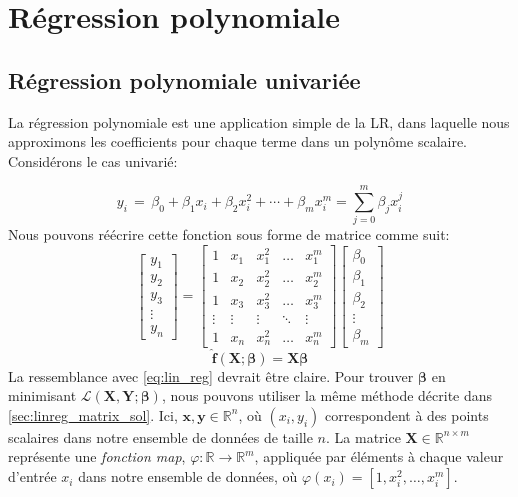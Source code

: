 \section{Régression polynomiale}\label{sec:poly_reg}

\subsection{Régression polynomiale univariée}

La régression polynomiale est une application simple de la LR, dans laquelle nous approximons les coefficients pour chaque terme dans un polynôme scalaire. Considérons le cas univarié:

\begin{equation}
y_i \,=\, \beta_0 + \beta_1 x_i + \beta_2 x_i^2 + \cdots + \beta_m x_i^m = \sum_{j=0}^{m} \beta_j x_i^{j}
\end{equation}
%
Nous pouvons réécrire cette fonction sous forme de matrice comme suit:
%
\begin{equation}
\begin{bmatrix} y_1\\ y_2\\ y_3 \\ \vdots \\ y_n \end{bmatrix}= \begin{bmatrix} 1 & x_1 & x_1^2 & \dots & x_1^m \\ 1 & x_2 & x_2^2 & \dots & x_2^m \\ 1 & x_3 & x_3^2 & \dots & x_3^m \\ \vdots & \vdots & \vdots & \ddots & \vdots \\ 1 & x_n & x_n^2 & \dots & x_n^m \end{bmatrix} \begin{bmatrix} \beta_0\\ \beta_1\\ \beta_2\\ \vdots \\ \beta_m \end{bmatrix}
\end{equation}
%
\begin{equation}
\mathbf{\hat f}(\mathbf{X}; \bm\beta) = \mathbf{X}\bm\beta
\end{equation}
%
La ressemblance avec \autoref{eq:lin_reg} devrait être claire. Pour trouver $\bm\beta$ en minimisant $\mathcal L(\mathbf{X}, \mathbf{Y};\bm\beta)$, nous pouvons utiliser la même méthode décrite dans \autoref{sec:linreg_matrix_sol}. Ici, $\mathbf x, \mathbf y \in \mathbb R^n$, où $(x_i, y_i)$ correspondent à des points scalaires dans notre ensemble de données de taille $n$. La matrice $\mathbf X \in \mathbb R^{n \times m}$ représente une \textit{fonction map}, $\varphi : \mathbb R \rightarrow \mathbb R^m$, appliquée par éléments à chaque valeur d'entrée $x_i$ dans notre ensemble de données, où $\varphi(x_i) = \left[1, x_i^2, \ldots, x_i^m\right]$.

